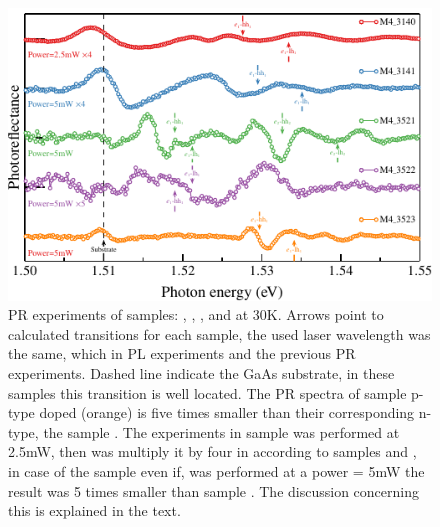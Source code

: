 \begin{figure}[t!]
	\centering
	\includegraphics[width=\textwidth]{../figures/chapter-3/pr-plots/build-ruco/pr-set2.pdf}
	\caption{ PR experiments of samples: , , ,  and  at 30K. Arrows point to calculated transitions for each sample, the used laser wavelength was the same, which in PL experiments and the previous PR experiments. Dashed line indicate the GaAs substrate, in these samples this transition is well located.  The PR spectra of sample  p-type doped (orange) is five times smaller  than their corresponding n-type, the sample . The experiments in sample  was performed at 2.5mW, then was multiply it by four in according to samples  and , in case of the sample even if,  was performed at a power = 5mW the result was 5 times smaller than sample . The discussion concerning this is explained in the text. }
	\label{fig:chapter-3-PR-PLOT-SET2}
\end{figure}

